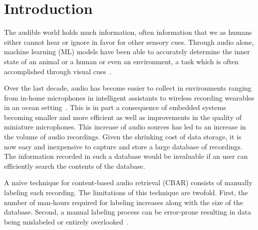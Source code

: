 \section{Introduction}

The audible world holds much information, often information that we as humans
either cannot hear or ignore in favor for other sensory cues. Through audio
alone, machine learning (ML) models have been able to accurately determine 
the inner state of an animal or a human or even an environment, 
a task which is often accomplished through visual cues~\cite{Farago2010,
schuller-acoustic-2009,Eronen2006}. 

Over the last decade, audio has become easier to collect in environments ranging
from in-home microphones in intelligent assistants to wireless recording 
wearables in an ocean setting~\cite{kohlsdorf-underwater-2013,Lane2015,
Choudhury2008}.
This is in part a consequence of embedded systems becoming smaller and more
efficient as well as improvements in the quality of miniature
microphones.
This increase of audio sources has led to an increase in the volume of audio
recordings. Given the shrinking cost of data storage, it is now easy and
inexpensive to capture and store a large database of recordings.
The information recorded in such a database would be invaluable if an user 
can efficiently search the contents of the database.


A na\"ive technique for content-based audio retrieval (CBAR) consists of
manually labeling each recording. 
The limitations of this technique are twofold.
First, the number of man-hours required for labeling increases along with the
size of the database.
Second, a manual labeling process can be error-prone resulting in data
being mislabeled or entirely overlooked~\cite{Bardeli2009,Rong2018}. 


